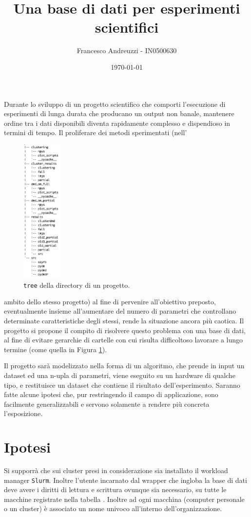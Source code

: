\documentclass{article}
\title{Una base di dati per esperimenti scientifici}
\author{Francesco Andreuzzi - IN0500630}
\date{\today}
\begin{document}
\maketitle

Durante lo sviluppo di un progetto scientifico che comporti l'esecuzione di esperimenti di lunga durata che producano un output non banale, mantenere ordine tra i dati disponibili diventa rapidamente complesso e dispendioso in termini di tempo. Il proliferare dei metodi sperimentati (nell'\hphantom{xcjxxsksjskksksk}
\begin{figure}
    \vspace{-0.9cm}
    \includegraphics[width=2cm]{res/tree_brutto.png}
    \caption{\texttt{tree} della directory di un progetto.}\label{fig:tree}
\end{figure}
ambito dello stesso progetto) al fine di pervenire all'obiettivo preposto, eventualmente insieme all'aumentare del numero di parametri che controllano determinate caratteristiche degli stessi, rende la situazione ancora più caotica.  Il progetto si propone il compito di risolvere questo problema con una base di dati, al fine di evitare gerarchie di cartelle con cui risulta difficoltoso lavorare a lungo termine (come quella in Figura \ref{fig:tree}).

Il progetto sarà modelizzato nella forma di un algoritmo, che prende in input un dataset ed una n-upla di parametri, viene eseguito su un hardware di qualche tipo, e restituisce un dataset che contiene il risultato dell'esperimento. Saranno fatte alcune ipotesi che, pur restringendo il campo di applicazione, sono facilmente generalizzabili e servono solamente a rendere più concreta l'esposizione.

\section{Ipotesi}
\label{sec:ipotesi}
Si supporrà che sui cluster presi in considerazione sia installato il workload manager \texttt{Slurm}. Inoltre l'utente incarnato dal wrapper che ingloba la base di dati deve avere i diritti di lettura e scrittura ovunque sia necessario, su tutte le macchine registrate nella tabella . Inoltre ad ogni macchina (computer personale o un cluster) è associato un nome univoco all'interno dell'organizzazione.
\end{document}
